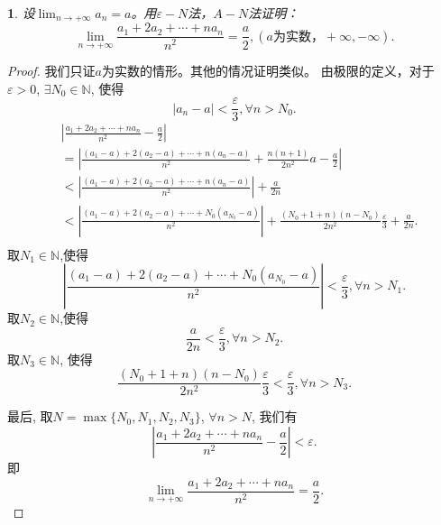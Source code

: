\documentclass[utf8]{book}
\newtheorem{example}{}[section]             %
\begin{document}
\begin{example}
设$\displaystyle \lim_{n\to +\infty}a_n = a$。用$\varepsilon-N$法，$A-N$法证明：
$$\displaystyle \lim_{n\to +\infty}\frac{a_1+2a_2+\cdots+na_n}{n^2} = \frac{a}{2}, (a \text{为实数}， +\infty, -\infty).$$

\end{example}
\begin{proof}
我们只证$a$为实数的情形。其他的情况证明类似。
由极限的定义，对于$\varepsilon > 0$, $\exists N_0\in \mathbb{N}$, 使得$$\left|a_n - a\right| < \frac{\varepsilon}{3}, \forall n > N_0.$$
\begin{equation*}
\begin{split}
&\left | \frac{a_1+2a_2+\cdots+na_n}{n^2}  - \frac{a}{2} \right | \\&= \left | \frac{(a_1-a)+2(a_2-a)+\cdots+n(a_n-a)}{n^2} +\frac{n(n+1)}{2n^2}a - \frac{a}{2} \right |\\
 													 &< \left | \frac{(a_1-a)+2(a_2-a)+\cdots+n(a_n-a)}{n^2}\right | + \frac{a}{2n} \\
													 &<\left | \frac{(a_1-a)+2(a_2-a)+\cdots+N_0(a_{N_0}-a)}{n^2}\right | + \frac{(N_0+1+n)(n-N_0)}{2n^2}\frac{\varepsilon}{3} + \frac{a}{2n}.\\
	\end{split}
\end{equation*}
取$N_1 \in \mathbb{N}$,使得
$$\left | \frac{(a_1-a)+2(a_2-a)+\cdots+N_0(a_{N_0}-a)}{n^2}\right | <\frac{\varepsilon}{3}, \forall n > N_1.$$
取$N_2 \in \mathbb{N}$,使得
$$\frac{a}{2n} < \frac{\varepsilon}{3}, \forall n > N_2.$$
取$N_3\in \mathbb{N}$, 使得
$$\frac{(N_0+1+n)(n-N_0)}{2n^2}\frac{\varepsilon}{3} < \frac{\varepsilon}{3}, \forall n> N_3.$$

最后, 取$N = \max\{N_0, N_1, N_2, N_3\}$, $\forall n > N$, 我们有
$$\left | \frac{a_1+2a_2+\cdots+na_n}{n^2}  - \frac{a}{2} \right | < \varepsilon.$$
即$$\displaystyle \lim_{n\to +\infty}\frac{a_1+2a_2+\cdots+na_n}{n^2} = \frac{a}{2}.$$
\end{proof}
\end{document}
